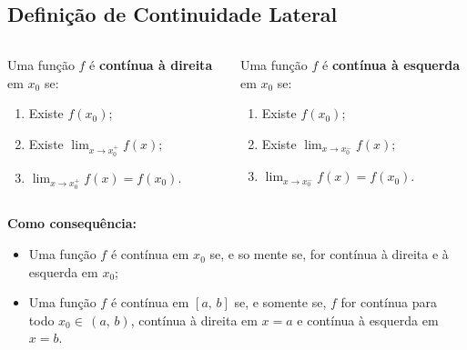 \subsection{Definição de Continuidade Lateral}
\begin{frame}
  \begin{columns}[onlytextwidth]
    \begin{column}{0.49\textwidth}\vspace{-0.5cm}
      \begin{definition}
        Uma função $f$ é \textbf{contínua à direita} em $x_{0}$ se:
        \begin{enumerate}
          \item Existe $f(x_{0})$;
          \item Existe $\displaystyle\lim_{x\to x_{0}^{+}}{f(x)}$;
          \item $\displaystyle\lim_{x\to x_{0}^{+}}{f(x)}=f(x_{0})$.\vspace{-0.1cm}
        \end{enumerate}
      \end{definition}
    \end{column}
    \begin{column}{0.49\textwidth}\vspace*{-0.5cm}
      \begin{definition}
        Uma função $f$ é \textbf{contínua à esquerda} em $x_{0}$ se:
        \begin{enumerate}
          \item Existe $f(x_{0})$;
          \item Existe $\displaystyle\lim_{x\to x_{0}^{-}}{f(x)}$;
          \item $\displaystyle\lim_{x\to x_{0}^{-}}{f(x)}=f(x_{0})$.\vspace{-0.1cm}
        \end{enumerate}
      \end{definition}
    \end{column}
  \end{columns}
  \begin{highlight}
    \textbf{Como consequência:}
    \begin{itemize}
      \item Uma função $f$ é contínua em $x_{0}$ se, e so mente se, for contínua à direita e à esquerda em $x_{0}$;
      \item Uma função $f$ é contínua em $[a,\,b]$ se, e somente se, $f$ for contínua para todo $x_{0}\in\,(a,\,b)$, contínua à direita em $x=a$ e contínua à esquerda em $x=b$.
    \end{itemize}
  \end{highlight}
\end{frame}


